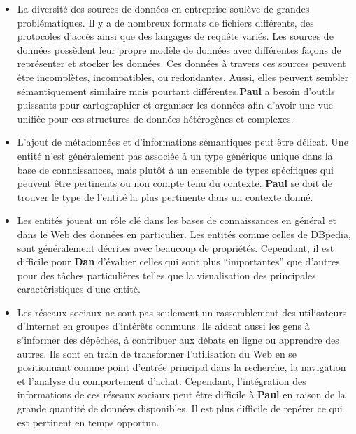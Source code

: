 \begin{itemize}
\item La diversit\'{e} des sources de donn\'{e}es en entreprise soul\`{e}ve de grandes probl\'{e}matiques. Il y a de nombreux formats de fichiers diff\'{e}rents, des protocoles d'acc\`{e}s ainsi que des langages de requête vari\'{e}s. Les sources de donn\'{e}es poss\`{e}dent leur propre mod\`{e}le de donn\'{e}es avec diff\'{e}rentes façons de repr\'{e}senter et stocker les donn\'{e}es. Ces donn\'{e}es à travers ces sources peuvent être incompl\`{e}tes, incompatibles, ou redondantes. Aussi, elles peuvent sembler s\'{e}mantiquement similaire mais pourtant diff\'{e}rentes.\textbf{Paul} a besoin d'outils puissants pour cartographier et organiser les donn\'{e}es afin d'avoir une vue unifi\'{e}e pour ces structures de donn\'{e}es h\'{e}t\'{e}rog\`{e}nes et complexes.
\item L'ajout de m\'{e}tadonn\'{e}es et d'informations s\'{e}mantiques peut être d\'{e}licat. Une entit\'{e} n'est g\'{e}n\'{e}ralement pas associ\'{e}e à un type g\'{e}n\'{e}rique unique dans la base de connaissances, mais plutôt à un ensemble de types sp\'{e}cifiques qui peuvent être pertinents ou non compte tenu du contexte. \textbf{Paul} se doit de trouver le type de l'entit\'{e} la plus pertinente dans un contexte donn\'{e}.
\item Les entit\'{e}s jouent un rôle cl\'{e} dans les bases de connaissances en g\'{e}n\'{e}ral et dans le Web des donn\'{e}es en particulier. Les entit\'{e}s comme celles de DBpedia, sont g\'{e}n\'{e}ralement d\'{e}crites avec beaucoup de propri\'{e}t\'{e}s. Cependant, il est difficile pour \textbf{Dan} d'\'{e}valuer celles qui sont plus ``importantes'' que d'autres pour des tâches particuli\`{e}res telles que la visualisation des principales caract\'{e}ristiques d'une entit\'{e}.
\item Les r\'{e}seaux sociaux ne sont pas seulement un rassemblement des utilisateurs d'Internet en groupes d'int\'{e}rêts communs. Ils aident aussi les gens à s'informer des d\'{e}pêches, à contribuer aux d\'{e}bats en ligne ou apprendre des autres. Ils sont en train de transformer l'utilisation du Web en se positionnant comme point d'entr\'{e}e principal dans la recherche, la navigation et l'analyse du comportement d'achat. Cependant, l'int\'{e}gration des informations de ces r\'{e}seaux sociaux peut être difficile à \textbf{Paul} en raison de la grande quantit\'{e} de donn\'{e}es disponibles. Il est plus difficile de rep\'{e}rer ce qui est pertinent en temps opportun.
\end{itemize}

